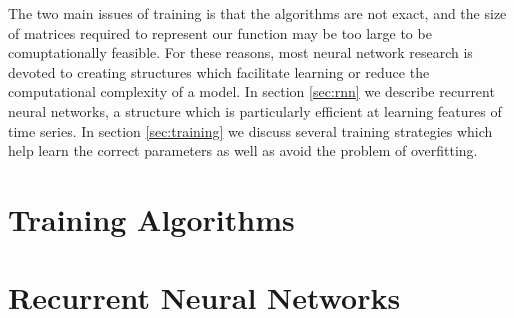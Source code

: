 The two main issues of training is that the algorithms are not exact, and the size of matrices required to represent our function may be too large to be comuptationally feasible. For these reasons, most neural network research is devoted to creating structures which facilitate learning or reduce the computational complexity of a model.  In section \ref{sec:rnn} we describe recurrent neural networks, a structure which is particularly efficient at learning features of time series.  In section \ref{sec:training} we discuss several training strategies which help learn the correct parameters as well as avoid the problem of overfitting.

\section{Training Algorithms}

\section{Recurrent Neural Networks}
